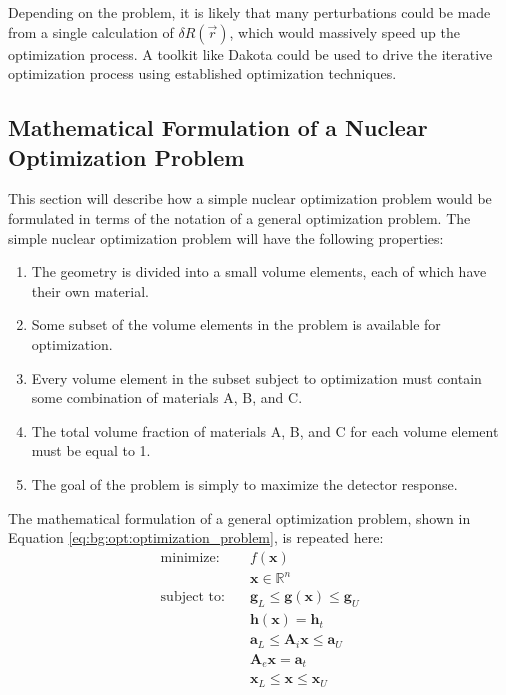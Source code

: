 Depending on the problem, it is likely that many perturbations could be made from a single calculation of $\delta R\left(\vec{r}\right)$, which would massively speed up the optimization process.
A toolkit like Dakota could be used to drive the iterative optimization process using established optimization techniques.

\subsection{Mathematical Formulation of a Nuclear Optimization Problem}
\label{sec:proposal:mathematical_formulation}

This section will describe how a simple nuclear optimization problem would be formulated in terms of the notation of a general optimization problem.
The simple nuclear optimization problem will have the following properties:
\begin{enumerate}
  \item The geometry is divided into a small volume elements, each of which have their own material.
  \item Some subset of the volume elements in the problem is available for optimization.
  \item Every volume element in the subset subject to optimization must contain some combination of materials A, B, and C.
  \item The total volume fraction of materials A, B, and C for each volume element must be equal to 1.
  \item The goal of the problem is simply to maximize the detector response.
\end{enumerate}

The mathematical formulation of a general optimization problem, shown in Equation \ref{eq:bg:opt:optimization_problem}, is repeated here:
\begin{equation*}\begin{split}
  \mbox{minimize:}  \quad & f\left(\textbf{x}\right) \\
                          & \textbf{x} \in \mathbb{R}^n \\
  \mbox{subject to:}\quad & \textbf{g}_L \leq \textbf{g}\left(\textbf{x}\right) \leq \textbf{g}_U \\
                          & \textbf{h}\left(\textbf{x}\right) = \textbf{h}_t \\
                          & \textbf{a}_L \leq \textbf{A}_i\textbf{x} \leq \textbf{a}_U \\
                          & \textbf{A}_e\textbf{x} = \textbf{a}_t \\
                          & \textbf{x}_L \leq \textbf{x} \leq \textbf{x}_U
\end{split}\end{equation*}

